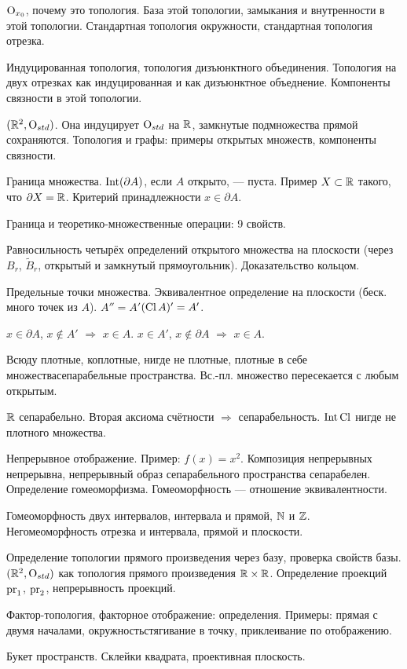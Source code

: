 \documentclass[a4paper,11pt]{extarticle}
\begin{document}
\begin{enumerate}
\itm $\mathrm O_{x_0}$, почему это топология. База этой топологии, замыкания и внутренности в этой топологии. Стандартная топология окружности, стандартная топология отрезка.

\itm Индуцированная топология, топология дизъюнктного объединения. Топология на двух отрезках как индуцированная и как дизъюнктное объеднение. Компоненты связности в этой топологии.

\itm $(\mathbb R^2, \mathrm O_{std})$. Она индуцирует $\mathrm O_{std}$ на $\mathbb R$, замкнутые подмножества прямой сохраняются. Топология и графы: примеры открытых множеств, компоненты связности.

\itm Граница множества. $\operatorname{Int} (\partial A)$, если $A$ открыто, — пуста. Пример $X \subset \mathbb R$ такого, что $\partial X = \mathbb R$. Критерий принадлежности $x \in \partial A$.

\itm Граница и теоретико-множественные операции: 9 свойств.

\itm Равносильность четырёх определений открытого множества на плоскости (через $B_r$, $\tilde B_r$, открытый и замкнутый прямоугольник). Доказательство кольцом.

\itm Предельные точки множества. Эквивалентное определение на плоскости (беск. много точек из $A$). $A'' = A'$\scolon $(\operatorname{Cl} A)' = A'$.

\itm $x \in \partial A$, $x \not \in A'$ $\Rightarrow$ $x \in A$. $x \in A'$, $x \not \in \partial A$ $\Rightarrow$ $x \in A$.

\itm Всюду плотные, коплотные, нигде не плотные, плотные в себе множества\scolon сепарабельные пространства. Вс.-пл. множество пересекается с любым открытым.

\itm $\mathbb R$ сепарабельно. Вторая аксиома счётности $\Rightarrow$ сепарабельность. $\operatorname{Int} \operatorname{Cl}$ нигде не плотного множества.

\itm Непрерывное отображение. Пример: $f(x) = x^2$. Композиция непрерывных непрерывна, непрерывный образ сепарабельного пространства сепарабелен. Определение гомеоморфизма. Гомеоморфность — отношение эквивалентности.

\itm Гомеоморфность двух интервалов, интервала и прямой, $\mathbb N$ и $\mathbb Z$. Негомеоморфность отрезка и интервала, прямой и плоскости.

\itm Определение топологии прямого произведения через базу, проверка свойств базы. $(\mathbb R^2, \mathrm O_{std})$ как топология прямого произведения $\mathbb R \times \mathbb R$. Определение проекций $\operatorname{pr}_1$, $\operatorname{pr}_2$, непрерывность проекций.

\itm Фактор-топология, факторное отображение: определения. Примеры: прямая с двумя началами, окружность\scolon стягивание в точку, приклеивание по отображению.

\itm Букет пространств. Склейки квадрата, проективная плоскость.

















\end{enumerate}
\end{document}
